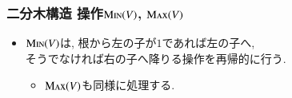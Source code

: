\documentclass[main]{subfiles}
\begin{document}
\begin{frame}\frametitle{二分木構造 操作$\mathrm{\text{M\textsc{in}}}(V)$, $\mathrm{\text{M\textsc{ax}}}(V)$}
\begin{itemize}
\item $\mathrm{\text{M\textsc{in}}}(V)$は, 根から左の子が$1$であれば左の子へ, \\そうでなければ右の子へ降りる操作を再帰的に行う.
\begin{itemize}
	\item $\mathrm{\text{M\textsc{ax}}}(V)$も同様に処理する.
\end{itemize}
\end{itemize}
\begin{columns}[t]
\begin{column}{0.45\linewidth} \end{column}
\begin{column}{0.54\linewidth} \end{column}
\end{columns}

\end{frame}
\end{document}
